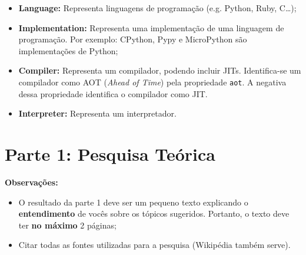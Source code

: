 \documentclass[answers]{exam}
\begin{document}
    \begin{itemize}
        \item \textbf{Language:} Representa linguagens de programação (e.g.
            Python, Ruby, C\ldots);
        \item \textbf{Implementation:} Representa uma implementação de uma
            linguagem de programação. Por exemplo: CPython, Pypy e MicroPython
            são implementações de Python;
        \item \textbf{Compiler:} Representa um compilador, podendo incluir
            JITs. Identifica-se um compilador como AOT (\textit{Ahead of Time})
            pela propriedade \texttt{aot}. A negativa dessa propriedade
            identifica o compilador como JIT\@.
        \item \textbf{Interpreter:} Representa um interpretador.
    \end{itemize}

    \section{Parte 1: Pesquisa Teórica}

    \begin{superframe}
        \textbf{Observações:}

        \begin{itemize}
            \item O resultado da parte 1 deve ser um pequeno texto
                explicando o \textbf{entendimento} de vocês sobre os
                tópicos sugeridos. Portanto, o texto deve ter \textbf{no
                máximo} 2 páginas;
            \item Citar todas as fontes utilizadas para a pesquisa
                (Wikipédia também serve).
        \end{itemize}
    \end{superframe}
\end{document}
